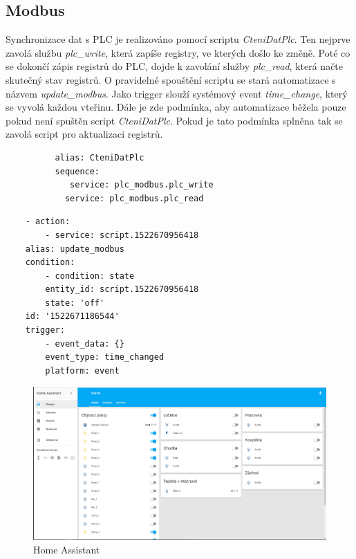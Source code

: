 \documentclass[a4paper,12pt,czech,bibliography=totoc]{scrbook}
\begin{document}
	\subsection{Modbus}
	Synchronizace dat s PLC je realizováno pomocí scriptu \textit{CteniDatPlc}. Ten nejprve zavolá službu \textit{plc\_write}, která zapíše registry, ve kterých došlo ke změně. Poté co se dokončí zápis registrů do PLC, dojde k zavolání služby \textit{plc\_read}, která načte skutečný stav registrů.
\newline
O pravidelné spouštění scriptu se stará automatizace s názvem \textit{update\_modbus}. Jako trigger slouží systémový event \textit{time\_change}, který se vyvolá každou vteřinu. Dále je zde podmínka, aby automatizace běžela pouze pokud není spuštěn script \textit{CteniDatPlc}. Pokud je tato podmínka splněna tak se zavolá script pro aktualizaci registrů.

	\begin{lstlisting}
		  alias: CteniDatPlc
		  sequence:
			 service: plc_modbus.plc_write
		    service: plc_modbus.plc_read
	\end{lstlisting}
	\begin{lstlisting}
	- action:
		- service: script.1522670956418
	alias: update_modbus
	condition:
		- condition: state
		entity_id: script.1522670956418
		state: 'off'
	id: '1522671186544'
	trigger:
		- event_data: {}
		event_type: time_changed
		platform: event
	\end{lstlisting}
	\begin{figure}[h]
	\centering
	\includegraphics[scale = 0.3]{home.PNG}
	\caption{Home Assistant}
	\label{fig:my_label}
\end{figure}
\end{document}
